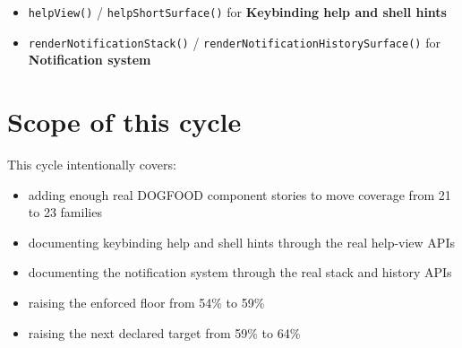 \begin{itemize}
\tightlist
\item
  \texttt{h\allowbreak{}e\allowbreak{}l\allowbreak{}p\allowbreak{}V\allowbreak{}i\allowbreak{}e\allowbreak{}w\allowbreak{}(\allowbreak{})} / \texttt{h\allowbreak{}e\allowbreak{}l\allowbreak{}p\allowbreak{}S\allowbreak{}h\allowbreak{}o\allowbreak{}r\allowbreak{}t\allowbreak{}S\allowbreak{}u\allowbreak{}r\allowbreak{}f\allowbreak{}a\allowbreak{}c\allowbreak{}e\allowbreak{}(\allowbreak{})} for \textbf{Keybinding help and shell hints}
\item
  \texttt{r\allowbreak{}e\allowbreak{}n\allowbreak{}d\allowbreak{}e\allowbreak{}r\allowbreak{}N\allowbreak{}o\allowbreak{}t\allowbreak{}i\allowbreak{}f\allowbreak{}i\allowbreak{}c\allowbreak{}a\allowbreak{}t\allowbreak{}i\allowbreak{}o\allowbreak{}n\allowbreak{}S\allowbreak{}t\allowbreak{}a\allowbreak{}c\allowbreak{}k\allowbreak{}(\allowbreak{})} / \texttt{r\allowbreak{}e\allowbreak{}n\allowbreak{}d\allowbreak{}e\allowbreak{}r\allowbreak{}N\allowbreak{}o\allowbreak{}t\allowbreak{}i\allowbreak{}f\allowbreak{}i\allowbreak{}c\allowbreak{}a\allowbreak{}t\allowbreak{}i\allowbreak{}o\allowbreak{}n\allowbreak{}H\allowbreak{}i\allowbreak{}s\allowbreak{}t\allowbreak{}o\allowbreak{}r\allowbreak{}y\allowbreak{}S\allowbreak{}u\allowbreak{}r\allowbreak{}f\allowbreak{}a\allowbreak{}c\allowbreak{}e\allowbreak{}(\allowbreak{})} for \textbf{Notification system}
\end{itemize}

\section{Scope of this cycle}\label{record-075-scope-of-this-cycle}

This cycle intentionally covers:

\begin{itemize}
\tightlist
\item
  adding enough real DOGFOOD component stories to move coverage from 21 to 23 families
\item
  documenting keybinding help and shell hints through the real help-view APIs
\item
  documenting the notification system through the real stack and history APIs
\item
  raising the enforced floor from 54\% to 59\%
\item
  raising the next declared target from 59\% to 64\%
\end{itemize}

